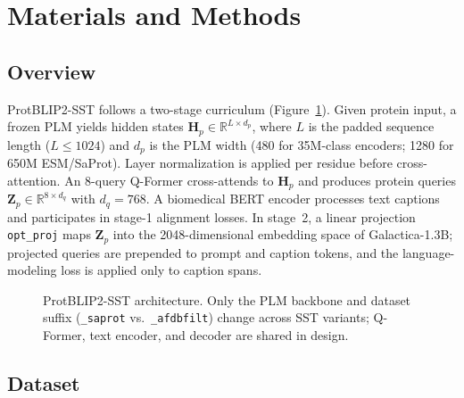 \documentclass[conference]{IEEEtran}
\begin{document}
\section{Materials and Methods}
\label{sec:methods}

\subsection{Overview}

ProtBLIP2-SST follows a two-stage curriculum (Figure~\ref{fig:architecture}).
Given protein input, a frozen PLM yields hidden states $\mathbf{H}_p \in \mathbb{R}^{L \times d_p}$, where $L$ is the padded sequence length ($L \le 1024$) and $d_p$ is the PLM width (480 for 35M-class encoders; 1280 for 650M ESM/SaProt).
Layer normalization is applied per residue before cross-attention.
An 8-query Q-Former cross-attends to $\mathbf{H}_p$ and produces protein queries $\mathbf{Z}_p \in \mathbb{R}^{8 \times d_q}$ with $d_q = 768$.
A biomedical BERT encoder processes text captions and participates in stage-1 alignment losses.
In stage~2, a linear projection \texttt{opt\_proj} maps $\mathbf{Z}_p$ into the 2048-dimensional embedding space of Galactica-1.3B; projected queries are prepended to prompt and caption tokens, and the language-modeling loss is applied only to caption spans.

\begin{figure}[t]
  \centering
  \caption{ProtBLIP2-SST architecture. Only the PLM backbone and dataset suffix (\texttt{\_saprot} vs.\ \texttt{\_afdbfilt}) change across SST variants; Q-Former, text encoder, and decoder are shared in design.}
  \label{fig:architecture}
\end{figure}

\subsection{Dataset}
\end{document}
